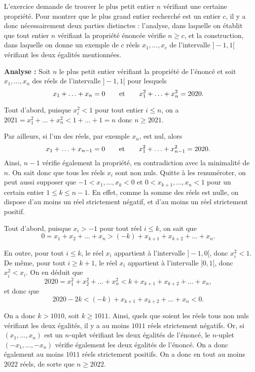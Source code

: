 L'exercice demande de trouver le plus petit entier $n$ vérifiant une certaine propriété. Pour montrer que le plus grand entier recherché est un entier $c$, il y a donc nécessairement deux parties distinctes : l'analyse, dans laquelle on établit que tout entier $n$ vérifiant la propriété énoncée vérifie $n\ge c$, et la construction, dans laquelle on donne un exemple de $c$ réels $x_1, \ldots , x_c$ de l'intervalle $]-1,1[$ vérifiant les deux égalités mentionnées.

\bigskip

\textbf{Analyse :}
Soit $n$ le plus petit entier vérifiant la propriété de l'énoncé et soit $x_1, \ldots , x_n$ des réels de l'intervalle $]-1,1[$ pour lesquels
$$x_1+\ldots +x_n =0 \hspace{6mm} \text{ et } \hspace{6mm}
x_1^2+\ldots +x_n^2 = 2020.$$

Tout d'abord, puisque $x_i^2 < 1$ pour tout entier $i \le n$, on a $2021=x_1^2+\ldots + x_n^2 <1+ \ldots +1 =n$ donc $n\ge 2021$.

Par ailleurs, si l'un des réels, par exemple $x_n$, est nul,
alors
$$x_1+\ldots +x_{n-1} =0 \hspace{6mm} \text{ et } \hspace{6mm}
x_1^2+\ldots +x_{n-1}^2 = 2020.$$
Ainsi, $n-1$ vérifie également la propriété, en contradiction
avec la minimalité de $n$. On sait donc que
tous les réels $x_i$ sont non nuls.
Quitte à les renuméroter, on peut aussi supposer que ${-1 < x_1, \ldots , x_k <0}$ et $0 < x_{k+1}, \ldots , x_n < 1$ pour un certain entier $1\le k \le n-1$. En effet, comme la somme des réels est nulle, on dispose d'au moins un réel strictement négatif, et d'au moins un réel strictement positif.

\medskip

Tout d'abord, puisque $x_i > -1$ pour tout réel $i \le k$, on sait que
$$0 = x_1 + x_2 + \ldots + x_n > (-k) + x_{k+1} + x_{k+2} + \ldots + x_n.$$

En outre, pour tout $i \le k$, le réel $x_i$ appartient à l'intervalle $]-1,0[$, donc $x_i^2 < 1$.
De même, pour tout $i \ge k+1$, le réel $x_i$ appartient
à l'intervalle $]0,1[$, donc $x_i^2 < x_i$.
On en déduit que
$$2020 = x_1^2 + x_2^2 + \ldots + x_n^2
< k + x_{k+1} + x_{k+2} + \ldots + x_n,$$
et donc que
$$2020 - 2k < (-k) + x_{k+1} + x_{k+2} + \ldots + x_n < 0.$$

On a donc $k>1010$, soit $k\ge 1011$. Ainsi, quels que soient les réels tous non nuls vérifiant les deux égalités, il y a au moins $1011$ réels strictement négatifs. Or, si $(x_1, \ldots ,x_n)$ est un $n$-uplet vérifiant les deux égalités de l'énoncé, le $n$-uplet
$(-x_1, \ldots , -x_n)$ vérifie également les deux égalités de l'énoncé. On a donc également au moins $1011$ réels strictement positifs. On a donc en tout au moins $2022$ réels, de sorte que $n\ge 2022$.

